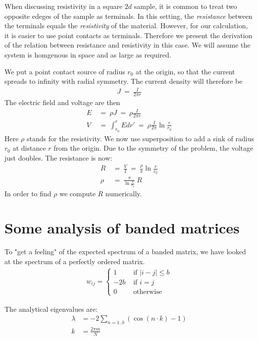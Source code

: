 When discussing resistivity in a square $2d$ sample, it is common
to treat two opposite edeges of the sample as terminals.
In this setting, the \emph{resistance} between the terminals equals the
\emph{resistivity} of the material. However, for our calculation,
it is easier to use point contacts as terminals. Therefore we present the
derivation of the relation between resistance and resistivity in this case.
We will assume the system is homgenous in space and as large as required.


We put a point contact source of radius $r_0$ at the origin, so 
that the current spreads to infinity with radial symmetry. The current 
density will therefore be
%
\begin{align}
J\ =\ \frac{I}{2\pi r}
\end{align}
%
The electric field and voltage are then
%
\begin{align}
E \ &=\ \rho J\ =\ \rho \frac{I}{2\pi r } \\
V \ &=\ \int_{r_0}^r E dr' \ =\ \rho\frac{I}{2\pi}\ln \frac{r}{r_0}
\end{align}
%
Here $\rho$ stands for the resistivity. We now use superposition to add a sink of radius $r_0$ at distance $r$ 
from the origin. Due to the symmetry of the problem, the voltage just doubles. The resistance is now:
%
\begin{align}
R \ &=\ \frac{V}{I}\ =\ \frac{\rho}{\pi} \ln\frac{r}{r_0} \\
\rho \ &= \ \frac{\pi}{\ln\frac{r}{r_0}} \ R
\end{align}
%
In order to find $\rho$ we compute $R$ numerically.


\section{Some analysis of banded matrices}

To "get a feeling" of the expected spectrum of a banded matrix,
we have looked at the spectrum of a perfectly ordered matrix.
\begin{align}
  w_{ij} = 
  \begin{cases}
    1 \quad &\textrm{  if  } |i-j|\le b   \\
    -2 b &\textrm{  if  } i = j  \\
    0 \quad &\textrm{  otherwise }
  \end{cases}
\end{align}

The analytical eigenvalues are:
\begin{align}
  \lambda &= -2\sum_{n=1..b} (\cos(n\cdot k) -1) \\
  k &= \frac{2\pi m}{N}
\end{align}

